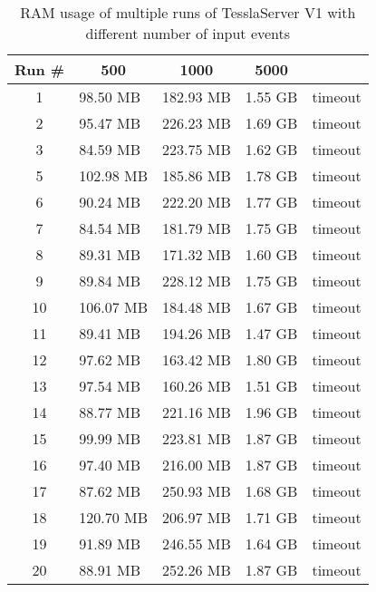 \begin{table}[!htb]
  \centering
  \caption{RAM usage of multiple runs of TesslaServer V1 with different number of input events}
  \label{table:tessla_server_v1_events_ram_usage_data}
  \begin{tabular}{cllll}
    Run \# & \multicolumn{1}{c}{500} & \multicolumn{1}{c}{1000} & \multicolumn{1}{c}{5000} \\ \hline
    1 & 98.50 MB  & 182.93 MB & 1.55 GB & timeout \\
    2 & 95.47 MB  & 226.23 MB & 1.69 GB & timeout\\
    3 & 84.59 MB  & 223.75 MB & 1.62 GB & timeout\\
    5 & 102.98 MB & 185.86 MB & 1.78 GB & timeout\\
    6 & 90.24 MB  & 222.20 MB & 1.77 GB & timeout\\
    7 & 84.54 MB  & 181.79 MB & 1.75 GB & timeout\\
    8 & 89.31 MB  & 171.32 MB & 1.60 GB & timeout\\
    9 & 89.84 MB  & 228.12 MB & 1.75 GB & timeout\\
    10 & 106.07 MB & 184.48 MB & 1.67 GB & timeout\\
    11 & 89.41 MB  & 194.26 MB & 1.47 GB & timeout\\
    12 & 97.62 MB  & 163.42 MB & 1.80 GB & timeout\\
    13 & 97.54 MB  & 160.26 MB & 1.51 GB & timeout\\
    14 & 88.77 MB  & 221.16 MB & 1.96 GB & timeout\\
    15 & 99.99 MB  & 223.81 MB & 1.87 GB & timeout\\
    16 & 97.40 MB  & 216.00 MB & 1.87 GB & timeout\\
    17 & 87.62 MB  & 250.93 MB & 1.68 GB & timeout\\
    18 & 120.70 MB & 206.97 MB & 1.71 GB & timeout\\
    19 & 91.89 MB  & 246.55 MB & 1.64 GB & timeout\\
    20 & 88.91 MB  & 252.26 MB & 1.87 GB & timeout
  \end{tabular}
\end{table}

